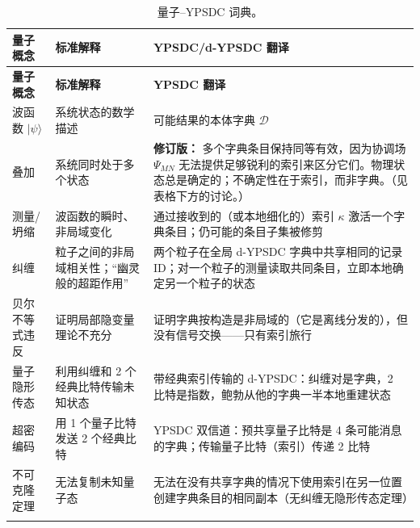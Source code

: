 \documentclass[12pt,a4paper]{article}
\theoremstyle{remark}
\begin{document}
	\begin{longtable}{p{3.8cm} p{5cm} p{7cm}}
		\caption{量子–YPSDC 词典。}\label{tab:quantum-dict}\\
		\toprule
		\textbf{量子概念} & \textbf{标准解释} & \textbf{YPSDC/d-YPSDC 翻译} \\
		\midrule
		\endfirsthead
		
		\toprule
		\textbf{量子概念} & \textbf{标准解释} & \textbf{YPSDC 翻译} \\
		\midrule
		\endhead
		
		\hline
		\endfoot
		
		\bottomrule
		\endlastfoot
		
		波函数 \(|\psi\rangle\) &
		系统状态的数学描述 &
		可能结果的本体字典 \(\mathcal{D}\) \\
		\addlinespace
		
		叠加 &
		系统同时处于多个状态 &
		\textbf{修订版：} 多个字典条目保持同等有效，因为协调场 \(\Psi_{MN}\) 无法提供足够锐利的索引来区分它们。物理状态总是确定的；不确定性在于索引，而非字典。（见表格下方的讨论。） \\
		\addlinespace
		
		测量/坍缩 &
		波函数的瞬时、非局域变化 &
		通过接收到的（或本地细化的）索引 \(\kappa\) 激活一个字典条目；仍可能的条目子集被修剪 \\
		\addlinespace
		
		纠缠 &
		粒子之间的非局域相关性；“幽灵般的超距作用” &
		两个粒子在全局 d-YPSDC 字典中共享相同的记录 ID；对一个粒子的测量读取共同条目，立即本地确定另一个粒子的状态 \\
		\addlinespace
		
		贝尔不等式违反 &
		证明局部隐变量理论不充分 &
		证明字典按构造是非局域的（它是离线分发的），但没有信号交换——只有索引旅行 \\
		\addlinespace
		
		量子隐形传态 &
		利用纠缠和 2 个经典比特传输未知状态 &
		带经典索引传输的 d-YPSDC：纠缠对是字典，2 比特是指数，鲍勃从他的字典一半本地重建状态 \\
		\addlinespace
		
		超密编码 &
		用 1 个量子比特发送 2 个经典比特 &
		YPSDC 双信道：预共享量子比特是 4 条可能消息的字典；传输量子比特（索引）传递 2 比特 \\
		\addlinespace
		
		不可克隆定理 &
		无法复制未知量子态 &
		无法在没有共享字典的情况下使用索引在另一位置创建字典条目的相同副本（无纠缠无隐形传态定理） \\
		\addlinespace
		

\end{longtable}
\end{document}
